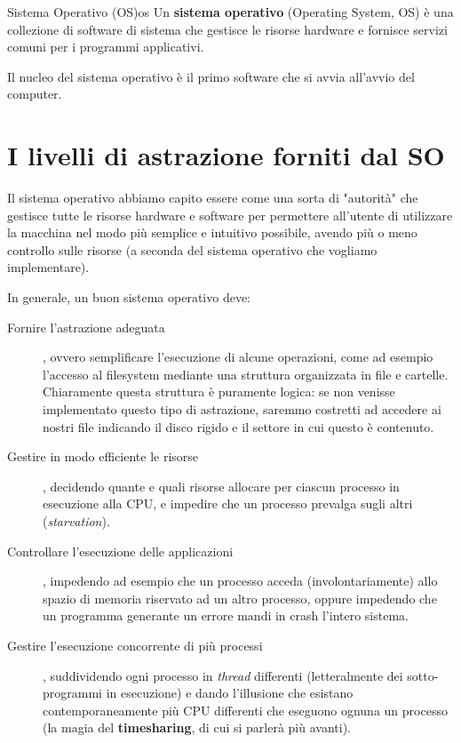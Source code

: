 \documentclass[12pt]{report}
\begin{document}
	\begin{definizione}{Sistema Operativo (OS)}{os}
		Un \textbf{sistema operativo} (Operating System, OS) è una collezione di software di sistema che gestisce le risorse hardware e fornisce servizi comuni per i programmi applicativi.
	\end{definizione}
	
	Il nucleo del sistema operativo è il primo software che si avvia all'avvio del computer.
	
	\section{I livelli di astrazione forniti dal SO}
	Il sistema operativo abbiamo capito essere come una sorta di "autorità" che gestisce tutte le risorse hardware e software per permettere all'utente di utilizzare la macchina nel modo più semplice e intuitivo possibile, avendo più o meno controllo sulle risorse (a seconda del sistema operativo che vogliamo implementare).
	
	In generale, un buon sistema operativo deve:
	\begin{description}
		\item [Fornire l'astrazione adeguata], ovvero semplificare l'esecuzione di alcune operazioni, come ad esempio l'accesso al filesystem mediante una struttura organizzata in file e cartelle. Chiaramente questa struttura è puramente logica: se non venisse implementato questo tipo di astrazione, saremmo costretti ad accedere ai nostri file indicando il disco rigido e il settore in cui questo è contenuto.
		
		\item [Gestire in modo efficiente le risorse], decidendo quante e quali risorse allocare per ciascun processo in esecuzione alla CPU, e impedire che un processo prevalga sugli altri (\textit{starvation}).
		
		\item [Controllare l'esecuzione delle applicazioni], impedendo ad esempio che un processo acceda (involontariamente) allo spazio di memoria riservato ad un altro processo, oppure impedendo che un programma generante un errore mandi in crash l'intero sistema.
		
		\item [Gestire l'esecuzione concorrente di più processi], suddividendo ogni processo in \textit{thread} differenti (letteralmente dei sotto-programmi in esecuzione) e dando l'illusione che esistano contemporaneamente più CPU differenti che eseguono ognuna un processo (la magia del \textbf{timesharing}, di cui si parlerà più avanti).
	\end{description}
	
\end{document}

